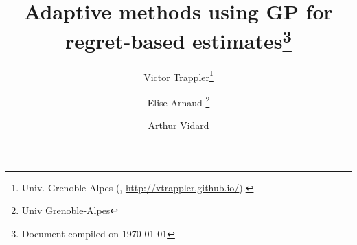 

\usepackage{lipsum}
\usepackage{amsfonts}
\usepackage{graphicx}
\usepackage{epstopdf}
\usepackage{algorithmic}
\usepackage[T1]{fontenc}
\usepackage[utf8]{inputenc}
\ifpdf
\else
\fi

\newcommand{\creflastconjunction}{, and~}



\title{Adaptive methods using GP for regret-based estimates\thanks{Document compiled on \today }%
}

\author{Victor Trappler\thanks{Univ. Grenoble-Alpes  (, \url{http://vtrappler.github.io/}).}
\and Elise Arnaud \thanks{Univ Grenoble-Alpes} \and Arthur Vidard\footnotemark[3]}

\usepackage{amsopn}
\DeclareMathOperator{\diag}{diag}
\newcommand{\kk}{\theta}
\newcommand{\uu}{u}
\newcommand{\KK}{\theta}
\newcommand{\UU}{U}
\newcommand{\Kspace}{\Theta}
\newcommand{\Uspace}{\mathbb{U}}
\newcommand{\Xspace}{\mathbb{X}}
\newcommand{\Prob}{\mathbb{P}}
\newcommand{\Ex}{\mathbb{E}}
\newcommand{\argmin}{\mathrm{arg}\,\mathrm{min}}
\newcommand{\argmax}{\mathrm{arg}\,\mathrm{max}}
